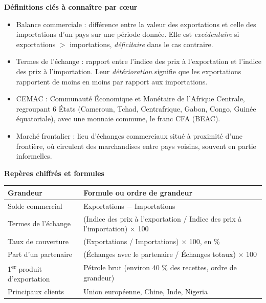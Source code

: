\documentclass[11pt]{article}
\newcommand{\cle}[1]{{\popxbold\color{popdark}#1}}
\begin{document}
\begin{bilan}
\textbf{Définitions clés à connaître par cœur}
\begin{itemize}
  \item \cle{Balance commerciale} : différence entre la valeur des exportations et celle des importations d'un pays sur une période donnée. Elle est \emph{excédentaire} si exportations $>$ importations, \emph{déficitaire} dans le cas contraire.
  \item \cle{Termes de l'échange} : rapport entre l'indice des prix à l'exportation et l'indice des prix à l'importation. Leur \emph{détérioration} signifie que les exportations rapportent de moins en moins par rapport aux importations.
  \item \cle{CEMAC} : Communauté Économique et Monétaire de l'Afrique Centrale, regroupant 6 États (Cameroun, Tchad, Centrafrique, Gabon, Congo, Guinée équatoriale), avec une monnaie commune, le franc CFA (BEAC).
  \item \cle{Marché frontalier} : lieu d'échanges commerciaux situé à proximité d'une frontière, où circulent des marchandises entre pays voisins, souvent en partie informelles.
\end{itemize}

\textbf{Repères chiffrés et formules}
\begin{center}
\begin{tabularx}{\linewidth}{|l|X|}\hline
\rowcolor{popblueL} \textbf{Grandeur} & \textbf{Formule ou ordre de grandeur} \\ \hline
Solde commercial & Exportations $-$ Importations \\ \hline
Termes de l'échange & (Indice des prix à l'exportation / Indice des prix à l'importation) $\times$ 100 \\ \hline
Taux de couverture & (Exportations / Importations) $\times$ 100, en \% \\ \hline
Part d'un partenaire & (Échanges avec le partenaire / Échanges totaux) $\times$ 100 \\ \hline
1\textsuperscript{er} produit d'exportation & Pétrole brut (environ 40 \% des recettes, ordre de grandeur) \\ \hline
Principaux clients & Union européenne, Chine, Inde, Nigeria \\ \hline
\end{tabularx}
\end{center}


\end{bilan}
\end{document}
